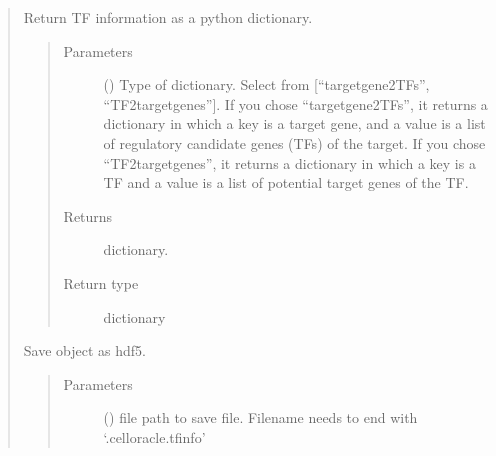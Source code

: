 \documentclass[letterpaper,10pt,english]{sphinxmanual}
\begin{document}
\begin{quote}
\begin{fulllineitems}
\begin{fulllineitems}
\label{\detokenize{modules/celloracle.motif_analysis:celloracle.motif_analysis.TFinfo.to_dictionary}}
Return TF information as a python dictionary.
\begin{quote}\begin{description}
\item[{Parameters}] \leavevmode
{} () \textendash{} Type of dictionary. Select from {[}“targetgene2TFs”, “TF2targetgenes”{]}.
If you chose “targetgene2TFs”, it returns a dictionary in which a key is a target gene, and a value is a list of regulatory candidate genes (TFs) of the target.
If you chose “TF2targetgenes”, it returns a dictionary in which a key is a TF and a value is a list of potential target genes of the TF.

\item[{Returns}] \leavevmode
dictionary.

\item[{Return type}] \leavevmode
dictionary

\end{description}\end{quote}

\end{fulllineitems}


\begin{fulllineitems}
\label{\detokenize{modules/celloracle.motif_analysis:celloracle.motif_analysis.TFinfo.to_hdf5}}
Save object as hdf5.
\begin{quote}\begin{description}
\item[{Parameters}] \leavevmode
{} () \textendash{} file path to save file. Filename needs to end with ‘.celloracle.tfinfo’

\end{description}\end{quote}


\end{fulllineitems}
\end{fulllineitems}
\end{quote}
\end{document}
